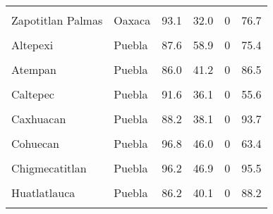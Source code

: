\documentclass[
]{report}
\begin{document}
\begin{longtable}[t]{llrrrr}
\addlinespace
\cellcolor{gray!6}{Yutanduchi de Guerrero} & \cellcolor{gray!6}{Oaxaca} & \cellcolor{gray!6}{94.1} & \cellcolor{gray!6}{35.7} & \cellcolor{gray!6}{0} & \cellcolor{gray!6}{82.6}\\
Zapotitlan Palmas & Oaxaca & 93.1 & 32.0 & 0 & 76.7\\
\cellcolor{gray!6}{Acteopan} & \cellcolor{gray!6}{Puebla} & \cellcolor{gray!6}{79.5} & \cellcolor{gray!6}{62.8} & \cellcolor{gray!6}{0} & \cellcolor{gray!6}{82.1}\\
Altepexi & Puebla & 87.6 & 58.9 & 0 & 75.4\\
\cellcolor{gray!6}{Amixtlan} & \cellcolor{gray!6}{Puebla} & \cellcolor{gray!6}{77.4} & \cellcolor{gray!6}{34.2} & \cellcolor{gray!6}{0} & \cellcolor{gray!6}{96.7}\\
\addlinespace
Atempan & Puebla & 86.0 & 41.2 & 0 & 86.5\\
\cellcolor{gray!6}{Atexcal} & \cellcolor{gray!6}{Puebla} & \cellcolor{gray!6}{93.7} & \cellcolor{gray!6}{33.5} & \cellcolor{gray!6}{0} & \cellcolor{gray!6}{55.5}\\
Caltepec & Puebla & 91.6 & 36.1 & 0 & 55.6\\
\cellcolor{gray!6}{Camocuautla} & \cellcolor{gray!6}{Puebla} & \cellcolor{gray!6}{76.2} & \cellcolor{gray!6}{34.2} & \cellcolor{gray!6}{0} & \cellcolor{gray!6}{99.7}\\
Caxhuacan & Puebla & 88.2 & 38.1 & 0 & 93.7\\
\addlinespace
\cellcolor{gray!6}{Coatepec} & \cellcolor{gray!6}{Puebla} & \cellcolor{gray!6}{91.7} & \cellcolor{gray!6}{37.6} & \cellcolor{gray!6}{0} & \cellcolor{gray!6}{100.0}\\
Cohuecan & Puebla & 96.8 & 46.0 & 0 & 63.4\\
\cellcolor{gray!6}{Cuautempan} & \cellcolor{gray!6}{Puebla} & \cellcolor{gray!6}{91.5} & \cellcolor{gray!6}{45.4} & \cellcolor{gray!6}{0} & \cellcolor{gray!6}{72.3}\\
Chigmecatitlan & Puebla & 96.2 & 46.9 & 0 & 95.5\\
\cellcolor{gray!6}{Chignautla} & \cellcolor{gray!6}{Puebla} & \cellcolor{gray!6}{88.3} & \cellcolor{gray!6}{50.5} & \cellcolor{gray!6}{0} & \cellcolor{gray!6}{69.2}\\
\addlinespace
Huatlatlauca & Puebla & 86.2 & 40.1 & 0 & 88.2\\
\cellcolor{gray!6}{Hueyapan} & \cellcolor{gray!6}{Puebla} & \cellcolor{gray!6}{90.7} & \cellcolor{gray!6}{42.3} & \cellcolor{gray!6}{0} & \cellcolor{gray!6}{97.1}\\

\end{longtable}
\end{document}
